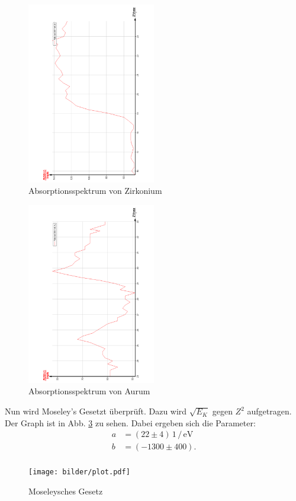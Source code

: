 \begin{figure}
  \centering
  \includegraphics[width=0.5\textwidth, angle=270]{bilder/AbsorpZr.pdf}
  \caption{Absorptionsspektrum von Zirkonium}
  \label{fig:Zirkonium}
\end{figure}

\begin{figure}
  \centering
  \includegraphics[width=0.5\textwidth, angle=270]{bilder/AbsorpAu.pdf}
  \caption{Absorptionsspektrum von Aurum}
  \label{fig:Aurum}
\end{figure}

\newpage
Nun wird Moseley's Gesetzt überprüft. Dazu wird $\sqrt{E_K}$ gegen $Z^2$ aufgetragen.
Der Graph ist in Abb. \ref{fig:Mose} zu sehen.
Dabei ergeben sich die Parameter:
\begin{align*}
  a &= (22 \pm 4) \,1\,/\, \si{\electronvolt}\\
  b &= (-1300 \pm 400). \\
\end{align*}
\begin{figure}
  \centering
  \texttt{[image: bilder/plot.pdf]}
  \caption{Moseleysches Gesetz}
  \label{fig:Mose}
\end{figure}
